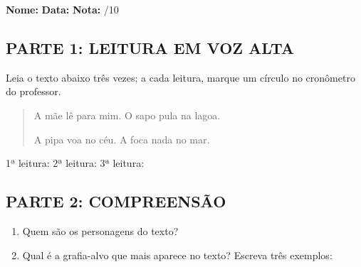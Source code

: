 \begin{exercicio}

\noindent\textbf{Nome:} \underline{\hspace{3.2cm}} \quad \textbf{Data:} \underline{\hspace{1.6cm}} \quad \textbf{Nota:} \underline{\hspace{0.9cm}}/10


\subsection*{PARTE 1: LEITURA EM VOZ ALTA}

Leia o texto abaixo três vezes; a cada leitura, marque um círculo no cronômetro do professor.

\begin{quote}
A mãe lê para mim. O sapo pula na lagoa.

A pipa voa no céu. A foca nada no mar.
\end{quote}

\begin{center}
1ª leitura: \underline{\hspace{1.5cm}} \quad 2ª leitura: \underline{\hspace{1.5cm}} \quad 3ª leitura: \underline{\hspace{1.5cm}}
\end{center}

\subsection*{PARTE 2: COMPREENSÃO}

\begin{enumerate}

  \item Quem são os personagens do texto?
  \begin{center}
  \underline{\hspace{12cm}}
  \end{center}

  \item Qual é a grafia-alvo que mais aparece no texto? Escreva três exemplos:
  \begin{center}
  \underline{\hspace{3.5cm}} \quad \underline{\hspace{3.5cm}} \quad \underline{\hspace{3.5cm}}
  \end{center}


\end{enumerate}
\end{exercicio}
